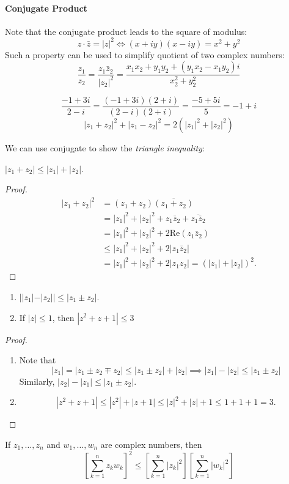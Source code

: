 \paragraph{Conjugate Product}
Note that the conjugate product leads to the square of modulus:
\[
z\cdot\bar z =  |z|^2
\Longleftrightarrow
(x+iy)(x-iy) = x^2 + y^2
\]
Such a property can be used to simplify quotient of two complex numbers:
\[
\frac{z_1}{z_2}=\frac{z_1\bar z_2}{|z_2|^2}=\frac{x_1x_2 + y_1y_2 + (y_1x_2 - x_1y_2)i}{x_2^2+y_2^2}
\]
\begin{example}
\[
\frac{-1+3i}{2-i}=\frac{(-1+3i)(2+i)}{(2-i)(2+i)}=\frac{-5+5i}{5}=-1+i
\]
\[
|z_1+z_2|^2 + |z_1-z_2|^2 = 2(|z_1|^2+|z_2|^2)
\]
\end{example}
We can use conjugate to show the \emph{triangle inequality}:
\begin{proposition}
$|z_1+z_2|\le|z_1|+ |z_2|$.
\end{proposition}
\begin{proof}
\begin{align*}
|z_1+z_2|^2&=(z_1+z_2)\overline{(z_1+z_2)}\\
&=|z_1|^2+|z_2|^2+z_1\bar z_2 + \overline{z_1\bar z_2}\\
&=|z_1|^2+|z_2|^2+2\mbox{Re}(z_1\bar z_2)\\
&\le |z_1|^2+|z_2|^2+2|z_1\bar z_2|\\
&=|z_1|^2+|z_2|^2+2|z_1z_2|=(|z_1|+|z_2|)^2.
\end{align*}
\end{proof}
\begin{corollary}
\begin{enumerate}
\item
$||z_1| - |z_2||\le |z_1\pm z_2|$.
\item
If $|z|\le 1$, then $|z^2+z+1|\le 3$
\end{enumerate}
\end{corollary}
\begin{proof}
\begin{enumerate}
\item
Note that 
\[
|z_1| = |z_1\pm z_2\mp z_2|\le |z_1\pm z_2|+|z_2|\implies
|z_1|-|z_2|\le |z_1\pm z_2|
\]
Similarly, $|z_2| - |z_1|\le |z_1\pm z_2|$.
\item
\[
|z^2+z+1|\le |z^2|+|z+1|\le |z|^2 + |z|  + 1\le1+1+1=3.
\]
\end{enumerate}
\end{proof}
\begin{proposition}
If $z_1,\dots,z_n$ and $w_1,\dots,w_n$ are complex numbers, then
\[
\left[
\sum_{k=1}^nz_kw_k
\right]^2
\le
\left[
\sum_{k=1}^n|z_k|^2
\right]
\left[
\sum_{k=1}^n|w_k|^2
\right]
\]
\end{proposition}
